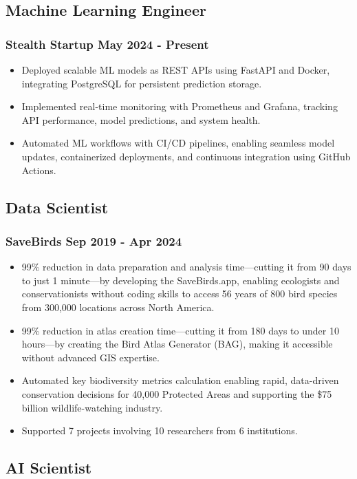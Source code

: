 \documentclass[11pt]{article} %
\begin{document}
\subsection{Machine Learning Engineer}
\subsubsection{Stealth Startup \hfill May 2024 - Present}
\begin{itemize}
	\item Deployed scalable ML models as REST APIs using FastAPI and Docker, integrating PostgreSQL for persistent prediction storage.
	\item Implemented real-time monitoring with Prometheus and Grafana, tracking API performance, model predictions, and system health. 
	\item Automated ML workflows with CI/CD pipelines, enabling seamless model updates, containerized deployments, and continuous integration using GitHub Actions.
\end{itemize}

\subsection{Data Scientist}
\subsubsection{SaveBirds \hfill Sep 2019 - Apr 2024}
\begin{itemize}
	\item 99\% reduction in data preparation and analysis time—cutting it from 90 days to just 1 minute—by developing the SaveBirds.app, enabling ecologists and conservationists without coding skills to access 56 years of 800 bird species from 300,000 locations across North America.
	\item 99\% reduction in atlas creation time—cutting it from 180 days to under 10 hours—by creating the Bird Atlas Generator (BAG), making it accessible without advanced GIS expertise.
	\item Automated key biodiversity metrics calculation enabling rapid, data-driven conservation decisions for 40,000 Protected Areas and supporting the \$75 billion wildlife-watching industry.
	\item Supported 7 projects involving 10 researchers from 6 institutions.
\end{itemize}

\subsection{AI Scientist}
\end{document}
